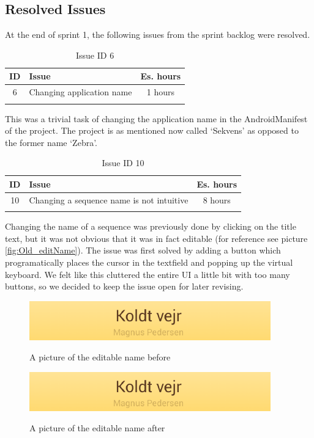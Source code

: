 \subsection{Resolved Issues} \label{subsec:spr1_resolved_issues}

At the end of sprint 1, the following issues from the sprint backlog were resolved.
\begin{longtable} { | c | p{12cm} | c | } 
\hline
	ID 	&	Issue	&		 Es. hours \\\hline
	6	& 	Changing application name	&	1 hours	\\\hline
\caption{Issue ID 6}
\label{tab:spr1_issue6}
\end{longtable}
This was a trivial task of changing the application name in the AndroidManifest of the project. The project is as mentioned now called `Sekvens' as opposed to the former name `Zebra'.

\begin{longtable} { | c | p{12cm} | c | } 
\hline
	ID 	&	Issue	&		 Es. hours \\\hline
	10	& 	Changing a sequence name is not intuitive	&	8 hours	\\\hline
\caption{Issue ID 10}
\label{tab:spr1_issue10}
\end{longtable}
Changing the name of a sequence was previously done by clicking on the title text, but it was not obvious that it was in fact editable (for reference see picture \ref{fig:Old_editName}).  The issue was first solved by adding a button which programatically places the cursor in the textfield and popping up the virtual keyboard. We felt like this cluttered the entire UI a little bit with too many buttons, so we decided to keep the issue open for later revising. 
\begin{figure} [h!]
\centering
\begin{minipage}{.7\textwidth}
\centering
\includegraphics{Pics/Sprint1/Gammelt/change_sequence_name}
\caption{A picture of the editable name before}
\label{fig:Old_editName}
\includegraphics{Pics/Sprint1/Gammelt/change_sequence_name}
\caption{A picture of the editable name after}
\label{fig:New_editName}
\end{minipage}\hfill
\end{figure}

